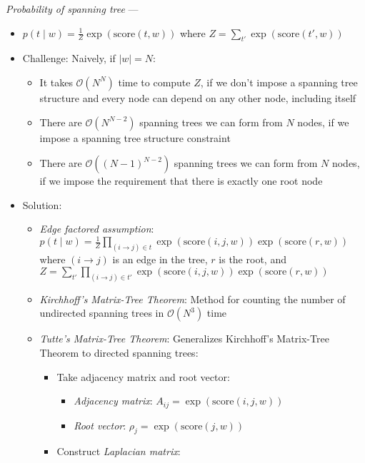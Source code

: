\emph{Probability of spanning tree} ---
\begin{itemize}
    \item 
    $
    p(t \mid w) = \frac{1}{Z} \exp(\textrm{score}(t, w))
    $ 
    where 
    $Z = \sum_{t'} \exp(\textrm{score}(t', w))$
    \item Challenge: Naively, if $|w| = N$:
    \begin{itemize}
        \item It takes $\mathcal{O}(N^N)$ time to compute $Z$, if we don't impose a spanning tree structure and every node can depend on any other node, including itself
        \item There are $\mathcal{O}(N^{N-2})$ spanning trees we can form from $N$ nodes, if we impose a spanning tree structure constraint
        \item There are $\mathcal{O}((N-1)^{N-2})$ spanning trees we can form from $N$ nodes, if we impose the requirement that there is exactly one root node
    \end{itemize}
    \item Solution: 
    \begin{itemize}
        \item \emph{Edge factored assumption}: $
        p(t \mid w) = \frac{1}{Z} \prod_{(i \to j) \in t} \exp(\textrm{score}(i, j, w)) \exp(\textrm{score}(r, w))
        $ where $(i \to j)$ is an edge in the tree, $r$ is the root, and
        $
        Z = \sum_{t'} \prod_{(i \to j) \in t'} \exp(\textrm{score}(i, j, w)) \exp(\textrm{score}(r, w))
        $
        \item \emph{Kirchhoff's Matrix-Tree Theorem}: Method for counting the number of undirected spanning trees in $\mathcal{O}(N^3)$ time
        \item \emph{Tutte's Matrix-Tree Theorem}: Generalizes Kirchhoff's Matrix-Tree Theorem to directed spanning trees:
        \begin{itemize}
            \item Take adjacency matrix and root vector:
            \begin{itemize}
                \item \emph{Adjacency matrix}:
                $
                A_{ij} = \exp(\textrm{score}(i, j, w))
                $
                \item \emph{Root vector}:
                $
                \rho_j = \exp(\textrm{score}(j, w))
                $
            \end{itemize}
            \item Construct \emph{Laplacian matrix}:

\end{itemize}
\end{itemize}
\end{itemize}

